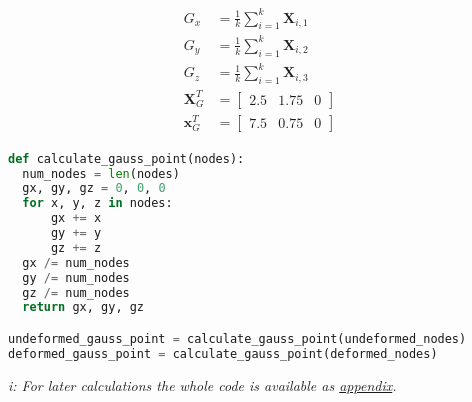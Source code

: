 \documentclass[12pt]{article}
\begin{document}
\begin{minipage}{0.35\textwidth}
      \label{eq:gauss_point}
      
      \begin{gather}
        \begin{align}
          G_x &= \frac{1}{k} \sum_{i=1}^{k} \textbf{X}_{i,1} \\
          G_y &= \frac{1}{k} \sum_{i=1}^{k} \textbf{X}_{i,2} \\
          G_z &= \frac{1}{k} \sum_{i=1}^{k} \textbf{X}_{i,3} \\[0.1cm]
          \textbf{X}_G^T &= \begin{bmatrix}
            2.5 & 1.75 & 0
          \end{bmatrix} \\[0.1cm]
          \textbf{x}_G^T &= \begin{bmatrix}
            7.5 & 0.75 & 0
          \end{bmatrix}
        \end{align} 
      \end{gather}
\end{minipage}%
\begin{minipage}{0.1\textwidth}
\space \!
\end{minipage}
\begin{minipage}{0.5\textwidth}
  \hspace{0.55 cm}
  \begin{lstlisting}[language=Python]
def calculate_gauss_point(nodes):
  num_nodes = len(nodes)
  gx, gy, gz = 0, 0, 0
  for x, y, z in nodes:
      gx += x
      gy += y
      gz += z
  gx /= num_nodes
  gy /= num_nodes
  gz /= num_nodes
  return gx, gy, gz

undeformed_gauss_point = calculate_gauss_point(undeformed_nodes)
deformed_gauss_point = calculate_gauss_point(deformed_nodes)
\end{lstlisting}
\end{minipage}

\begin{mygraybox}{\textit{i: For later calculations the whole code is available as \hyperref[page1]{appendix}.}}
\end{mygraybox}
\end{document}
